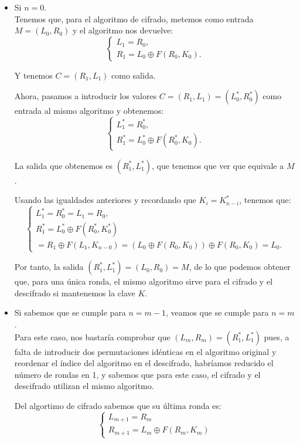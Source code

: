 \begin{itemize}
	\item Si $n = 0$.\\
	Tenemos que, para el algoritmo de cifrado, metemos como entrada $M = (L_0, R_0)$ y el algoritmo nos devuelve:
	$$\begin{cases}
		L_1 = R_0,\\
		R_1 = L_0 \oplus F(R_0, K_0).
	\end{cases}$$
	
	Y tenemos $C = (R_1, L_1)$ como salida.
	
	Ahora, pasamos a introducir los valores $C = (R_1, L_1) = (L^*_0, R^*_0)$ como entrada al mismo algoritmo y obtenemos:
	$$\begin{cases}
		L^*_1 = R^*_0,\\
		R^*_1 = L^*_0 \oplus F(R^*_0, K_0).
	\end{cases}$$
	
	La salida que obtenemos es $(R^*_1, L^*_1)$, que tenemos que ver que equivale a $M$.
	
	Usando las igualdades anteriores y recordando que $K_i = K^*_{n-i}$, tenemos que:
	$$\begin{cases}
		L^*_1 = R^*_0 = L_1 = R_0,\\
		R^*_1 = L^*_0 \oplus F(R^*_0, K^*_0) \\ = R_1 \oplus F(L_1, K_{n-0}) = \left(L_0 \oplus F(R_0, K_0)\right) \oplus F(R_0, K_0) = L_0.
	\end{cases}$$
	
	Por tanto, la salida $(R^*_1, L^*_1) = (L_0, R_0) = M$, de lo que podemos obtener que, para una única ronda, el mismo algoritmo sirve para el cifrado y el descifrado si mantenemos la clave $K$.
	
	\item Si sabemos que se cumple para $n = m-1$, veamos que se cumple para $n = m$.\\
	Para este caso, nos bastaría comprobar que $(L_m, R_m) = (R^*_1, L^*_1)$ pues, a falta de introducir dos permutaciones idénticas en el algoritmo original y reordenar el índice del algoritmo en el descifrado, habríamos reducido el número de rondas en 1, y sabemos que para este caso, el cifrado y el descifrado utilizan el mismo algoritmo.
	
	Del algortimo de cifrado sabemos que su última ronda es:
	$$\begin{cases}
		L_{m+1} = R_m\\
		R_{m+1} = L_m \oplus F(R_m, K_m)
	\end{cases}$$
	

\end{itemize}
